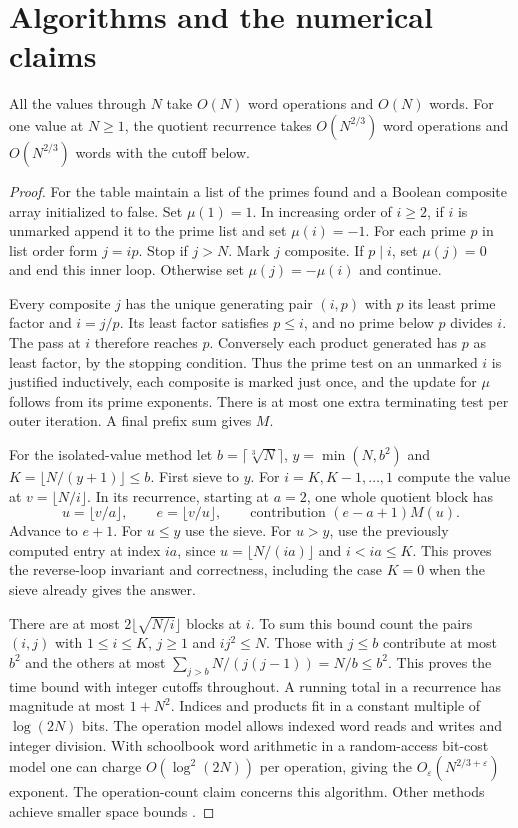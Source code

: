 \section{Algorithms and the numerical claims}\label{sec:computing}

\begin{theorem}\label{thm:algorithm}
All the values through $N$ take $O(N)$ word operations and $O(N)$ words. For one value at $N\ge1$, the quotient recurrence takes $O(N^{2/3})$ word operations and $O(N^{2/3})$ words with the cutoff below.
\end{theorem}
\begin{proof}
For the table maintain a list of the primes found and a Boolean composite array initialized to false. Set $\mu(1)=1$. In increasing order of $i\ge2$, if $i$ is unmarked append it to the prime list and set $\mu(i)=-1$. For each prime $p$ in list order form $j=ip$. Stop if $j>N$. Mark $j$ composite. If $p\mid i$, set $\mu(j)=0$ and end this inner loop. Otherwise set $\mu(j)=-\mu(i)$ and continue.

Every composite $j$ has the unique generating pair $(i,p)$ with $p$ its least prime factor and $i=j/p$. Its least factor satisfies $p\le i$, and no prime below $p$ divides $i$. The pass at $i$ therefore reaches $p$. Conversely each product generated has $p$ as least factor, by the stopping condition. Thus the prime test on an unmarked $i$ is justified inductively, each composite is marked just once, and the update for $\mu$ follows from its prime exponents. There is at most one extra terminating test per outer iteration. A final prefix sum gives $M$.

For the isolated-value method let $b=\lceil\sqrt[3]N\rceil$, $y=\min(N,b^2)$ and $K=\lfloor N/(y+1)\rfloor\le b$. First sieve to $y$. For $i=K,K-1,\ldots,1$ compute the value at $v=\lfloor N/i\rfloor$. In its recurrence, starting at $a=2$, one whole quotient block has
\[
 u=\lfloor v/a\rfloor,\qquad e=\lfloor v/u\rfloor,\qquad
 \text{contribution }(e-a+1)M(u).
\]
Advance to $e+1$. For $u\le y$ use the sieve. For $u>y$, use the previously computed entry at index $ia$, since $u=\lfloor N/(ia)\rfloor$ and $i<ia\le K$. This proves the reverse-loop invariant and correctness, including the case $K=0$ when the sieve already gives the answer.

There are at most $2\lfloor\sqrt{N/i}\rfloor$ blocks at $i$. To sum this bound count the pairs $(i,j)$ with $1\le i\le K$, $j\ge1$ and $ij^2\le N$. Those with $j\le b$ contribute at most $b^2$ and the others at most $\sum_{j>b}N/(j(j-1))=N/b\le b^2$. This proves the time bound with integer cutoffs throughout. A running total in a recurrence has magnitude at most $1+N^2$. Indices and products fit in a constant multiple of $\log(2N)$ bits. The operation model allows indexed word reads and writes and integer division. With schoolbook word arithmetic in a random-access bit-cost model one can charge $O(\log^2(2N))$ per operation, giving the $O_\varepsilon(N^{2/3+\varepsilon})$ exponent. The operation-count claim concerns this algorithm. Other methods achieve smaller space bounds \cite{ht}.
\end{proof}

